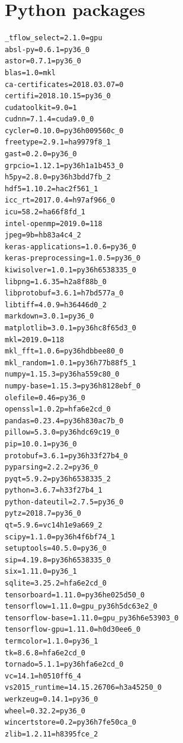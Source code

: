 \documentclass[a4paper, twoside, 10pt]{report}
\begin{document}
\section{Python packages}
\begin{verbatim}
_tflow_select=2.1.0=gpu
absl-py=0.6.1=py36_0
astor=0.7.1=py36_0
blas=1.0=mkl
ca-certificates=2018.03.07=0
certifi=2018.10.15=py36_0
cudatoolkit=9.0=1
cudnn=7.1.4=cuda9.0_0
cycler=0.10.0=py36h009560c_0
freetype=2.9.1=ha9979f8_1
gast=0.2.0=py36_0
grpcio=1.12.1=py36h1a1b453_0
h5py=2.8.0=py36h3bdd7fb_2
hdf5=1.10.2=hac2f561_1
icc_rt=2017.0.4=h97af966_0
icu=58.2=ha66f8fd_1
intel-openmp=2019.0=118
jpeg=9b=hb83a4c4_2
keras-applications=1.0.6=py36_0
keras-preprocessing=1.0.5=py36_0
kiwisolver=1.0.1=py36h6538335_0
libpng=1.6.35=h2a8f88b_0
libprotobuf=3.6.1=h7bd577a_0
libtiff=4.0.9=h36446d0_2
markdown=3.0.1=py36_0
matplotlib=3.0.1=py36hc8f65d3_0
mkl=2019.0=118
mkl_fft=1.0.6=py36hdbbee80_0
mkl_random=1.0.1=py36h77b88f5_1
numpy=1.15.3=py36ha559c80_0
numpy-base=1.15.3=py36h8128ebf_0
olefile=0.46=py36_0
openssl=1.0.2p=hfa6e2cd_0
pandas=0.23.4=py36h830ac7b_0
pillow=5.3.0=py36hdc69c19_0
pip=10.0.1=py36_0
protobuf=3.6.1=py36h33f27b4_0
pyparsing=2.2.2=py36_0
pyqt=5.9.2=py36h6538335_2
python=3.6.7=h33f27b4_1
python-dateutil=2.7.5=py36_0
pytz=2018.7=py36_0
qt=5.9.6=vc14h1e9a669_2
scipy=1.1.0=py36h4f6bf74_1
setuptools=40.5.0=py36_0
sip=4.19.8=py36h6538335_0
six=1.11.0=py36_1
sqlite=3.25.2=hfa6e2cd_0
tensorboard=1.11.0=py36he025d50_0
tensorflow=1.11.0=gpu_py36h5dc63e2_0
tensorflow-base=1.11.0=gpu_py36h6e53903_0
tensorflow-gpu=1.11.0=h0d30ee6_0
termcolor=1.1.0=py36_1
tk=8.6.8=hfa6e2cd_0
tornado=5.1.1=py36hfa6e2cd_0
vc=14.1=h0510ff6_4
vs2015_runtime=14.15.26706=h3a45250_0
werkzeug=0.14.1=py36_0
wheel=0.32.2=py36_0
wincertstore=0.2=py36h7fe50ca_0
zlib=1.2.11=h8395fce_2
\end{verbatim}
\end{document}
